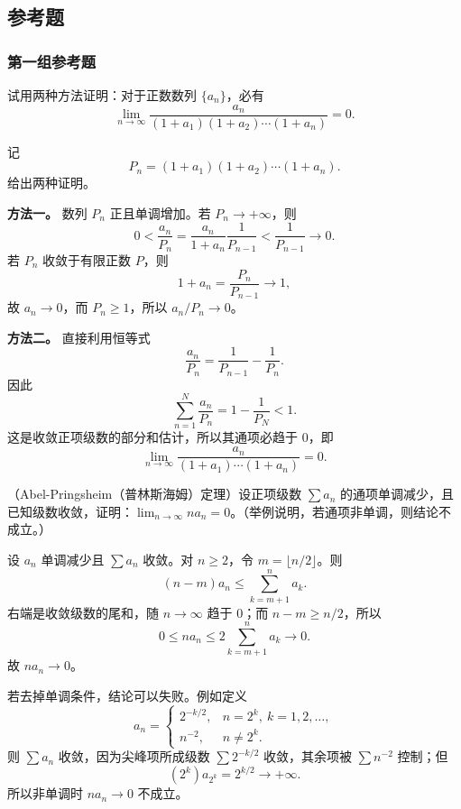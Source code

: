 \subsection{参考题}

\subsubsection*{第一组参考题}

\begin{xreferenceproblem}[1]
试用两种方法证明：对于正数数列 $\{a_n\}$，必有
\[
\lim_{n\to\infty}\frac{a_n}{(1+a_1)(1+a_2)\cdots(1+a_n)}=0.
\]
\end{xreferenceproblem}
\begin{xsolution}
记
\[
 P_n=(1+a_1)(1+a_2)\cdots(1+a_n).
\]
给出两种证明。

\textbf{方法一。} 数列 $P_n$ 正且单调增加。若 $P_n\to+\infty$，则
\[
 0<\frac{a_n}{P_n}
 =\frac{a_n}{1+a_n}\frac1{P_{n-1}}
 <\frac1{P_{n-1}}\longrightarrow0.
\]
若 $P_n$ 收敛于有限正数 $P$，则
\[
 1+a_n=\frac{P_n}{P_{n-1}}\longrightarrow1,
\]
故 $a_n\to0$，而 $P_n\geq1$，所以 $a_n/P_n\to0$。

\textbf{方法二。} 直接利用恒等式
\[
 \frac{a_n}{P_n}
 =\frac1{P_{n-1}}-\frac1{P_n}.
\]
因此
\[
 \sum_{n=1}^{N}\frac{a_n}{P_n}
 =1-\frac1{P_N}<1.
\]
这是收敛正项级数的部分和估计，所以其通项必趋于 $0$，即
\[
 \boxed{\lim_{n\to\infty}\frac{a_n}{(1+a_1)\cdots(1+a_n)}=0.}
\]
\end{xsolution}


\begin{xreferenceproblem}[2]
（Abel-Pringsheim（普林斯海姆）定理）设正项级数 $\sum a_n$ 的通项单调减少，且已知级数收敛，证明：$\lim_{n\to\infty}na_n=0$。（举例说明，若通项非单调，则结论不成立。）
\end{xreferenceproblem}
\begin{xsolution}
设 $a_n$ 单调减少且 $\sum a_n$ 收敛。对 $n\geq2$，令 $m=\lfloor n/2\rfloor$。则
\[
 (n-m)a_n\leq\sum_{k=m+1}^{n}a_k.
\]
右端是收敛级数的尾和，随 $n\to\infty$ 趋于 $0$；而 $n-m\geq n/2$，所以
\[
 0\leq na_n\leq2\sum_{k=m+1}^{n}a_k\longrightarrow0.
\]
故 $na_n\to0$。

若去掉单调条件，结论可以失败。例如定义
\[
 a_n=\begin{cases}
 2^{-k/2},&n=2^k,\ k=1,2,\ldots,\\
 n^{-2},&n\neq2^k.
 \end{cases}
\]
则 $\sum a_n$ 收敛，因为尖峰项所成级数 $\sum2^{-k/2}$ 收敛，其余项被 $\sum n^{-2}$ 控制；但
\[
 (2^k)a_{2^k}=2^{k/2}\to+\infty.
\]
所以非单调时 $na_n\to0$ 不成立。
\end{xsolution}


